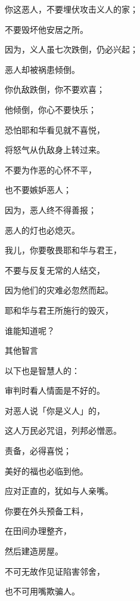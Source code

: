 {\par }{\BB \par }{\Q {}你这恶人，不要埋伏攻击义人的家；
\par }{\Q 不要毁坏他安居之所。
\par }{\Q {}因为，义人虽七次跌倒，仍必兴起；
\par }{\Q 恶人却被祸患倾倒。
\par }{\BB \par }{\Q {}你仇敌跌倒，你不要欢喜；
\par }{\Q 他倾倒，你心不要快乐；
\par }{\Q {}恐怕耶和华看见就不喜悦，
\par }{\Q 将怒气从仇敌身上转过来。
\par }{\BB \par }{\Q {}不要为作恶的心怀不平，
\par }{\Q 也不要嫉妒恶人；
\par }{\Q {}因为，恶人终不得善报；
\par }{\Q 恶人的灯也必熄灭。
\par }{\BB \par }{\Q {}我儿，你要敬畏耶和华与君王，
\par }{\Q 不要与反复无常的人结交，
\par }{\Q {}因为他们的灾难必忽然而起。
\par }{\Q 耶和华与君王所施行的毁灭，
\par }{\Q 谁能知道呢？
\par }{\SH 其他智言
\par }{\Q {}以下也是智慧人的{}：
\par }{\BB \par }{\Q 审判时看人情面是不好的。
\par }{\Q {}对恶人说「你是义人」的，
\par }{\Q 这人万民必咒诅，列邦必憎恶。
\par }{\Q {}责备{}，必得喜悦；
\par }{\Q 美好的福也必临到他。
\par }{\Q {}应对正直的，犹如与人亲嘴。
\par }{\BB \par }{\Q {}你要在外头预备工料，
\par }{\Q 在田间办理整齐，
\par }{\Q 然后建造房屋。
\par }{\BB \par }{\Q {}不可无故作见证陷害邻舍，
\par }{\Q 也不可用嘴欺骗人。
}

